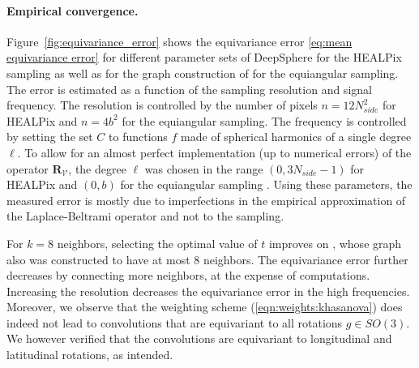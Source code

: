 \documentclass{article} %
\renewcommand{\b}[1]{{\bm{#1}}}  %
\newcommand{\V}{\mathcal{V}}  %
\newcommand{\Figref}[1]{Figure~\ref{fig:#1}}
\newcommand{\eqnref}[1]{(\ref{eqn:#1})}
\begin{document}
\paragraph{Empirical convergence.}

\Figref{equivariance_error} shows the equivariance error \eqref{eq:mean equivariance error} for different parameter sets of DeepSphere for the HEALPix sampling as well as for the graph construction of \citet{khasanova2017sphericalcnn} for the equiangular sampling.
The error is estimated as a function of the sampling resolution and signal frequency.
The resolution is controlled by the number of pixels $n = 12N_{side}^2$ for HEALPix and $n = 4b^2$ for the equiangular sampling.
The frequency is controlled by setting the set $C$ to functions $f$ made of spherical harmonics of a single degree $\ell$.
To allow for an almost perfect implementation (up to numerical errors) of the operator $\b{R}_\V$, the degree $\ell$ was chosen in the range $(0, 3N_{side}-1)$ for HEALPix and $(0, b)$ for the equiangular sampling \citep{gorski1999healpixprimer}.
Using these parameters, the measured error is mostly due to imperfections in the empirical approximation of the Laplace-Beltrami operator and not to the sampling.

For $k=8$ neighbors, selecting the optimal value of $t$ improves on \citet{perraudin2019deepspherecosmo}, whose graph also was constructed to have at most 8 neighbors.
The equivariance error further decreases by connecting more neighbors,  at the expense of computations.
Increasing the resolution decreases the equivariance error in the high frequencies.
Moreover, we observe that the weighting scheme \eqnref{weights:khasanova} does indeed not lead to convolutions that are equivariant to all rotations $g \in SO(3)$.
We however verified that the convolutions are equivariant to longitudinal and latitudinal rotations, as intended.
\end{document}
